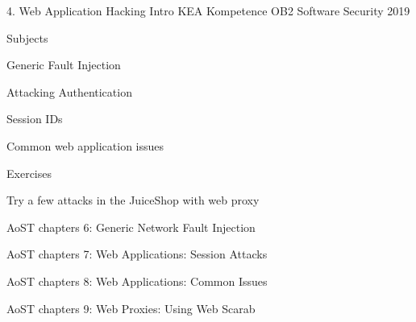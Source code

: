 \documentclass[Screen16to9,17pt]{foils}
\begin{document}
\mytitlepage
{4. Web Application Hacking Intro}
{KEA Kompetence OB2 Software Security 2019}


\begin{list1}
\item Subjects
\begin{list2}
\item Generic Fault Injection
\item Attacking Authentication
\item Session IDs
\item Common web application issues
\end{list2}
\item Exercises
\begin{list2}
\item  Try a few attacks in the JuiceShop with web proxy
\end{list2}
\end{list1}


\begin{list1}
\item AoST chapters 6: Generic Network Fault Injection
\item AoST chapters 7: Web Applications: Session  Attacks
\item AoST chapters 8: Web Applications: Common Issues
\item AoST chapters 9: Web Proxies: Using Web Scarab
\end{list1}



\begin{list1}
\item
\end{list1}


\end{document}
